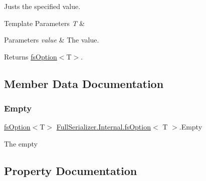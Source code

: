 Justs the specified value. 


\begin{DoxyTemplParams}{Template Parameters}
{\em T} & \\
\hline
\end{DoxyTemplParams}

\begin{DoxyParams}{Parameters}
{\em value} & The value.\\
\hline
\end{DoxyParams}
\begin{DoxyReturn}{Returns}
\hyperlink{struct_full_serializer_1_1_internal_1_1fs_option}{fs\+Option}$<$T$>$.
\end{DoxyReturn}


\subsection{Member Data Documentation}
\mbox{\label{struct_full_serializer_1_1_internal_1_1fs_option_a097ca5b76a5fe79d6b37dd76ec2b5844}} 
\subsubsection{\texorpdfstring{Empty}{Empty}}
{\footnotesize\ttfamily \hyperlink{struct_full_serializer_1_1_internal_1_1fs_option}{fs\+Option}$<$T$>$ \hyperlink{struct_full_serializer_1_1_internal_1_1fs_option}{Full\+Serializer.\+Internal.\+fs\+Option}$<$ T $>$.Empty\hspace{0.3cm}{\ttfamily [static]}}



The empty 



\subsection{Property Documentation}
\mbox{\label{struct_full_serializer_1_1_internal_1_1fs_option_a8271a12938fbe51299635f1998ee4659}} 

